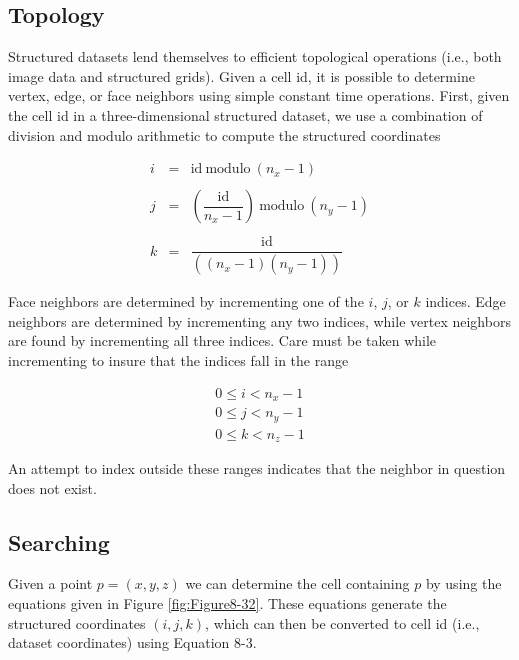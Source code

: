 \subsection{Topology}

Structured datasets lend themselves to efficient topological operations (i.e., both image data and structured grids). Given a cell id, it is possible to determine vertex, edge, or face neighbors using simple constant time operations. First, given the cell id in a three-dimensional structured dataset, we use a combination of division and modulo arithmetic to compute the structured coordinates

\begin{equation}\label{eq:8.29}
\begin{array}{lll}
i &=& \text{id}\ \text{modulo}\ (n_x - 1) \\ \\
j &=& \left( \dfrac{\text{id}}{n_x - 1} \right)\ \text{modulo}\ (n_y - 1) \\ \\
k &=& \dfrac{\text{id}}{\left((n_x - 1)(n_y - 1)\right)}
\end{array}
\end{equation}

Face neighbors are determined by incrementing one of the $i$, $j$, or $k$ indices. Edge neighbors are determined by incrementing any two indices, while vertex neighbors are found by incrementing all three indices. Care must be taken while incrementing to insure that the indices fall in the range

\begin{equation}\label{eq:8.30}
\begin{array}{l}
0 \leq i < n_x - 1 \\
0 \leq j < n_y - 1 \\
0 \leq k < n_z - 1
\end{array}
\end{equation}

An attempt to index outside these ranges indicates that the neighbor in question does not exist.

\subsection{Searching}

Given a point $p = (x, y, z)$ we can determine the cell containing $p$ by using the equations given in Figure \ref{fig:Figure8-32}. These equations generate the structured coordinates $(i, j, k)$, which can then be converted to cell id (i.e., dataset coordinates) using Equation 8-3.

